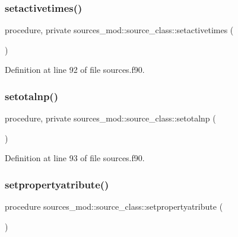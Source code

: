 \subsubsection{\texorpdfstring{setactivetimes()}{setactivetimes()}}
{\footnotesize\ttfamily procedure, private sources\+\_\+mod\+::source\+\_\+class\+::setactivetimes (\begin{DoxyParamCaption}{ }\end{DoxyParamCaption})\hspace{0.3cm}{\ttfamily [private]}}



Definition at line 92 of file sources.\+f90.

\mbox{\label{structsources__mod_1_1source__class_a6098dbb749bed525919e6370aed70ef9}} 
\subsubsection{\texorpdfstring{setotalnp()}{setotalnp()}}
{\footnotesize\ttfamily procedure, private sources\+\_\+mod\+::source\+\_\+class\+::setotalnp (\begin{DoxyParamCaption}{ }\end{DoxyParamCaption})\hspace{0.3cm}{\ttfamily [private]}}



Definition at line 93 of file sources.\+f90.

\mbox{\label{structsources__mod_1_1source__class_a248ab2049b6b36680b88e49e752f7400}} 
\subsubsection{\texorpdfstring{setpropertyatribute()}{setpropertyatribute()}}
{\footnotesize\ttfamily procedure sources\+\_\+mod\+::source\+\_\+class\+::setpropertyatribute (\begin{DoxyParamCaption}{ }\end{DoxyParamCaption})\hspace{0.3cm}{\ttfamily [private]}}



